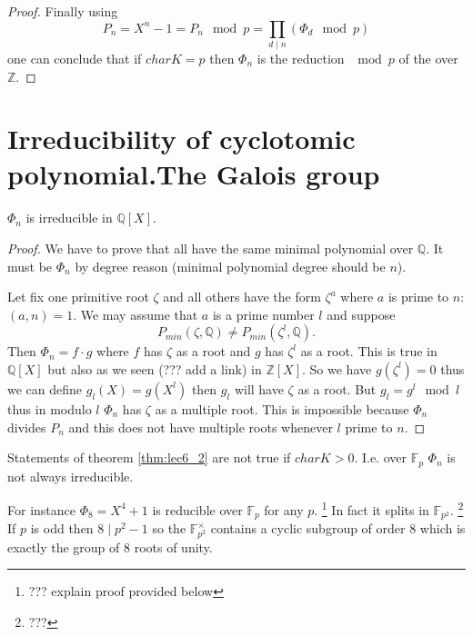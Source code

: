 \begin{proposition}
\begin{proof}
    Finally using
    \[
    P_n = X^n - 1 = P_n \mod p = \prod_{d \mid n} \left(\Phi_d \mod p\right)
    \]
    one can conclude that if $char K = p$ then $\Phi_n$ is the
    reduction $\mod{p}$ of the 
    over $\mathbb{Z}$.
    
  \end{proof}
\end{proposition}

\section{Irreducibility of cyclotomic polynomial.The Galois group}

\begin{theorem}
  $\Phi_n$ is irreducible in $\mathbb{Q}\left[X\right]$.
  \begin{proof}
    We have to prove that all  have
    the same minimal polynomial over $\mathbb{Q}$. It must be $\Phi_n$
    by degree reason (minimal polynomial degree should be $n$).

    Let fix one primitive root $\zeta$ and all others have the form
    $\zeta^a$ where $a$ is prime to $n$: $\left(a,n\right)=1$. We may
    assume that $a$ is a prime number $l$ and suppose
    \[
    P_{min}\left(\zeta, \mathbb{Q}\right)
    \ne
    P_{min}\left(\zeta^l, \mathbb{Q}\right).
    \]
    Then $\Phi_n = f \cdot g$ where $f$ has $\zeta$ as a root and $g$
    has $\zeta^l$ as a root. This is true in
    $\mathbb{Q}\left[X\right]$ but also as we seen (??? add a link) in
    $\mathbb{Z}\left[X\right]$. So we have $g\left(\zeta^l\right) = 0$
    thus we can define $g_l\left(X\right) = g\left(X^l\right)$ then
    $g_l$ will have $\zeta$ as a root. But $g_l = g^l \mod l$ thus in
    modulo $l$ $\Phi_n$ has $\zeta$ as a multiple root. This is
    impossible because $\Phi_n$ divides $P_n$ and this does not have
    multiple roots whenever $l$ prime to $n$. 
  \end{proof}
  \label{thm:lec6_2}
\end{theorem}

\begin{remark}
  Statements of theorem \ref{thm:lec6_2} are not true if $char K >
  0$. I.e. over $\mathbb{F}_p$ $\Phi_n$ is not always irreducible.

  For instance $\Phi_8 = X^4 + 1$ is reducible over $\mathbb{F}_p$ for
  any $p$.
  \footnote{
    ??? explain proof provided below
  }
  In fact it splits in $\mathbb{F}_{p^2}$.
  \footnote{
    ???
  }
  If $p$ is odd then $8\mid p^2-1$ so the 
  $\mathbb{F}_{p^2}^\times$ contains a cyclic subgroup of order 8 which is
  exactly the group of 8 roots of unity.
\end{remark}

